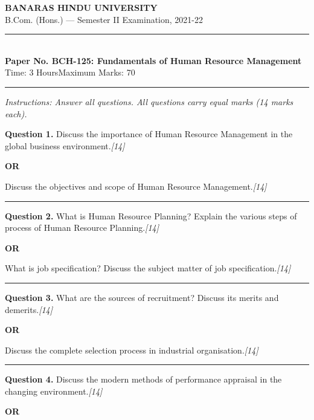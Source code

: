 \documentclass[11pt,a4paper]{article}
\newcommand{\pts}[1]{\hfill   \textit{[#1]}}
\begin{document}
\begin{center}
  {\large\bfseries BANARAS HINDU UNIVERSITY}\\[2pt]
  {\normalsize B.Com. (Hons.) --- Semester II Examination, 2021-22}\\[6pt]
  \rule{0.8\linewidth}{0.5pt}\\[6pt]
  {\large\bfseries Paper No. BCH-125: Fundamentals of Human Resource Management}\\[4pt]
  {\normalsize Time: 3 Hours\hfill Maximum Marks: 70}
\end{center}

\rule{\linewidth}{0.4pt}

\smallskip



\noindent   \textit{Instructions: Answer all questions. All questions carry equal marks (14 marks each).}

\bigskip




\noindent   \textbf{Question 1.}
Discuss the importance of Human Resource Management in the global business environment.\pts{14}

\centerline{   \textbf{OR}}

Discuss the objectives and scope of Human Resource Management.\pts{14}

\medskip\rule{\linewidth}{0.2pt}




\noindent   \textbf{Question 2.}
What is Human Resource Planning? Explain the various steps of process of Human Resource Planning.\pts{14}

\centerline{   \textbf{OR}}

What is job specification? Discuss the subject matter of job specification.\pts{14}

\medskip\rule{\linewidth}{0.2pt}




\noindent   \textbf{Question 3.}
What are the sources of recruitment? Discuss its merits and demerits.\pts{14}

\centerline{   \textbf{OR}}

Discuss the complete selection process in industrial organisation.\pts{14}

\medskip\rule{\linewidth}{0.2pt}




\noindent   \textbf{Question 4.}
Discuss the modern methods of performance appraisal in the changing environment.\pts{14}

\centerline{   \textbf{OR}}
\end{document}
